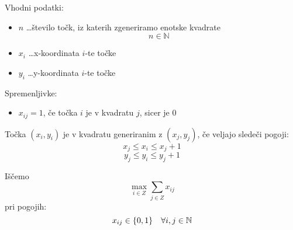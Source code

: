 \documentclass[a4, 12pt]{article}
\begin{document}
Vhodni podatki:
\begin{itemize}
\item{$n$ \dots število točk, iz katerih zgeneriramo enotske kvadrate} $$n \in \mathbb{N}$$
\item{$x_{i}$ \dots x-koordinata $i$-te točke}
\item{$y_{i}$ \dots y-koordinata $i$-te točke}
\end{itemize}

Spremenljivke:
\begin{itemize}
\item{$x_{ij}= 1$, če točka $i$ je v kvadratu $j$}, sicer je 0
\end{itemize}

Točka $(x_i,y_i)$ je v kvadratu generiranim z $(x_j, y_j)$, če veljajo sledeči pogoji:
$$x_j \le x_i \le x_j+1$$
$$y_j \le y_i \le y_j+1$$

Iščemo\\
$$\max_{i \in Z} \sum_{j\in Z} x_{ij} $$
pri pogojih:
$$x_{ij} \in \{0,1\} \quad\forall i,j \in \mathbb{N}\\$$


\cleardoublepage
\end{document}
